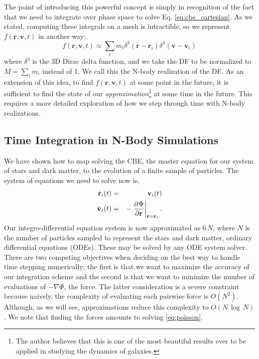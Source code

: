 The point of introducing this powerful concept is simply in recognition of the fact that we need to integrate over phase space to solve Eq. \eqref{eq:cbe_cartesian}. As we stated, computing these integrals on a mesh is intractible, so we represent $f(\textbf{r},\textbf{v},t)$ in another way:
\begin{equation}
f(\textbf{r},\textbf{v},t) \approx \sum_i m_i \delta^3(\textbf{r} - \textbf{r}_i) \delta^3(\textbf{v} - \textbf{v}_i)
\end{equation}
where $\delta^3$ is the 3D Dirac delta function, and we take the DF to be normalized to $M = \sum_i m_i$ instead of 1. We call this the N-body realization of the DF. As an extension of this idea, to find $f(\textbf{r},\textbf{v},t)$ at some point in the future, it is sufficient to find the state of our \textit{approximation}\footnote{The author believes that this is one of the most beautiful results ever to be applied in studying the dynamics of galaxies.} at some time in the future. This requires a more detailed exploration of how we step through time with N-body realizations.

\subsection{Time Integration in N-Body Simulations}

We have shown how to map solving the CBE, the master equation for our system of stars and dark matter, to the evolution of a finite sample of particles. The system of equations we need to solve now is,
\begin{eqnarray} \label{eq:nbody_system}
\dot{\textbf{r}}_i(t) &=& \textbf{v}_i(t)\\
\dot{\textbf{v}}_i(t) &=& -\left.\frac{\partial^{} {\Phi}}{\partial {\textbf{r}}^{}}\right\vert_{\textbf{r} = \textbf{r}_i}.
\end{eqnarray}
Our integro-differential equation system is now approximated as $6\,N$, where $N$ is the number of particles sampled to represent the stars and dark matter, ordinary differential equations (ODEs). These may be solved by any ODE system solver. There are two competing objectives when deciding on the best way to handle time stepping numerically; the first is that we want to maximize the accuracy of our integration scheme and the second is that we want to minimize the number of evaluations of $-\nabla \Phi$, the force. The latter consideration is a severe constraint because naively, the complexity of evaluating each pairwise force is $O(N^2)$.  Although, as we will see, approximations reduce this complexity to $O(N\,\log \, N)$. We note that finding the forces amounts to solving \eqref{eq:poisson}.

